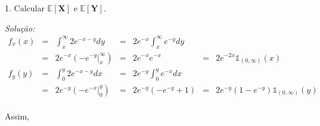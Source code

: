 \documentclass[a4paper, 11pt]{article}
\begin{document}
1. Calcular $\mathds{E}[\mathbf{X}]$ e $\mathds{E}[\mathbf{Y}]$.

\noindent
\textit{Solução:} \\
\begin{equation*}
\begin{array}{lccllll}
f_{x}(x) & = & \displaystyle\int_{x}^{\infty} 2 e^{-x-y} dy & = & 2e^{-x} \displaystyle\int_{x}^{\infty}e^{-y}dy\\ 
& = & \left. 2e^{-x}\left( - e^{-y}\right\vert_{x}^{\infty}\right) & = & 2e^{-x}e^{-x} & = & 2e^{-2x}\mathds{1}_{(0,\infty)}(x) \\[25pt]

f_{y}(y) & = & \displaystyle\int_{0}^{y} 2 e^{-x-y} dx & = & 2e^{-y} \displaystyle\int_{0}^{y}e^{-x}dx\\ 
& = & \left. 2e^{-y}\left( - e^{-x}\right\vert_{0}^{y}\right) & = & 2e^{-y}(-e^{-y}+1) & = & 2e^{-y}(1-e^{-y})\mathds{1}_{(0,\infty)}(y) \\
\end{array}
\end{equation*}

Assim,
\end{document}
